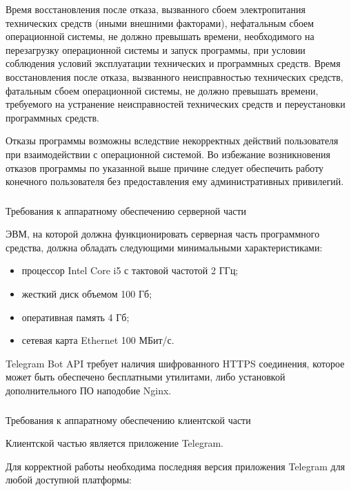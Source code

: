 Время восстановления после отказа, вызванного сбоем электропитания технических средств (иными внешними факторами), нефатальным сбоем операционной системы, не должно превышать времени, необходимого на перезагрузку операционной системы и запуск программы, при условии соблюдения условий эксплуатации технических и программных средств. Время восстановления после отказа, вызванного неисправностью технических средств, фатальным сбоем операционной системы, не должно превышать времени, требуемого на устранение неисправностей технических средств и переустановки программных средств.

Отказы программы возможны вследствие некорректных действий пользователя при взаимодействии с операционной системой. Во избежание возникновения отказов программы по указанной выше причине следует обеспечить работу конечного пользователя без предоставления ему административных привилегий.

\subsubsection{} Требования к аппаратному обеспечению серверной части
\label{sec:analysis:specification:server_requirments}

ЭВМ, на которой должна функционировать серверная часть программного средства, должна обладать следующими минимальными характеристиками:

\begin{itemize}
	\item процессор Intel Core i5 с тактовой частотой 2 ГГц;
	\item жесткий диск объемом 100 Гб;
	\item оперативная память 4 Гб;
	\item сетевая карта Ethernet 100 МБит/с.
\end{itemize}

Telegram Bot API требует наличия шифрованного HTTPS соединения, которое может быть обеспечено бесплатными утилитами, либо установкой дополнительного ПО наподобие Nginx.

\subsubsection{} Требования к аппаратному обеспечению клиентской части
\label{sec:analysis:specification:client_requirments}

Клиентской частью является приложение Telegram.

Для корректной работы необходима последняя версия приложения Telegram для любой доступной платформы:

